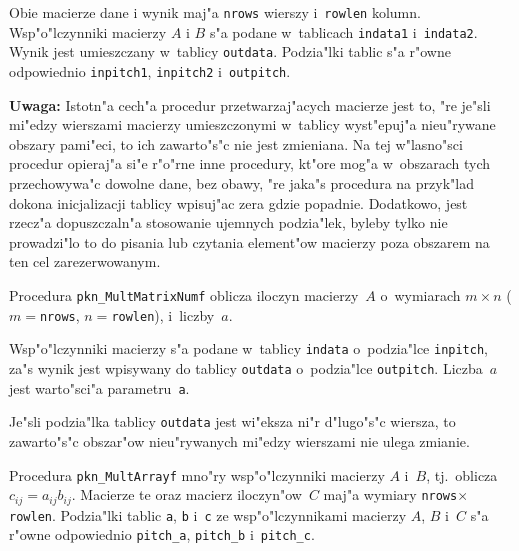 \vspace{\medskipamount}
Obie macierze dane i wynik maj"a \texttt{nrows} wierszy i~\texttt{rowlen}
kolumn. Wsp"o"lczynniki macierzy $A$ i $B$ s"a podane w~tablicach
\texttt{indata1} i~\texttt{indata2}. Wynik jest umieszczany w~tablicy
\texttt{outdata}. Podzia"lki tablic s"a r"owne odpowiednio
\texttt{inpitch1}, \texttt{inpitch2} i~\texttt{outpitch}.

\vspace{\medskipamount}
\noindent
\textbf{Uwaga:} Istotn"a cech"a procedur przetwarzaj"acych macierze jest to,
"re je"sli mi"edzy wierszami macierzy umieszczonymi w~tablicy wyst"epuj"a
nieu"rywane obszary pami"eci, to ich zawarto"s"c nie jest zmieniana. Na tej
w"lasno"sci procedur opieraj"a si"e r"o"rne inne procedury, kt"ore mog"a
w~obszarach tych przechowywa"c dowolne dane, bez obawy, "re jaka"s procedura
na przyk"lad dokona inicjalizacji tablicy wpisuj"ac zera gdzie popadnie.
Dodatkowo, jest rzecz"a dopuszczaln"a stosowanie ujemnych podzia"lek, byleby
tylko nie prowadzi"lo to do pisania lub czytania element"ow macierzy poza
obszarem na ten cel zarezerwowanym.

\vspace{\bigskipamount}
Procedura \texttt{pkn\_MultMatrixNumf} oblicza iloczyn macierzy~$A$
o~wymiarach $m\times n$ ($m={}$\texttt{nrows}, $n={}$\texttt{rowlen}),
i~liczby~$a$.

Wsp"o"lczynniki macierzy s"a podane w~tablicy \texttt{indata} o~podzia"lce
\texttt{inpitch}, za"s wynik jest wpisywany do tablicy \texttt{outdata}
o~podzia"lce \texttt{outpitch}. Liczba~$a$ jest warto"sci"a
parametru~\texttt{a}.

Je"sli podzia"lka tablicy \texttt{outdata} jest wi"eksza ni"r d"lugo"s"c
wiersza, to zawarto"s"c obszar"ow nieu"rywanych mi"edzy wierszami nie ulega
zmianie.


\newpage
Procedura \texttt{pkn\_MultArrayf} mno"ry wsp"o"lczynniki macierzy $A$
i~$B$, tj.\ oblicza $c_{ij}=a_{ij}b_{ij}$. Macierze te oraz macierz
iloczyn"ow~$C$ maj"a wymiary \texttt{nrows}$\times$\texttt{rowlen}.
Podzia"lki tablic \texttt{a}, \texttt{b} i~\texttt{c} ze wsp"o"lczynnikami
macierzy $A$, $B$ i~$C$ s"a r"owne odpowiednio \texttt{pitch\_a},
\texttt{pitch\_b} i~\texttt{pitch\_c}.

